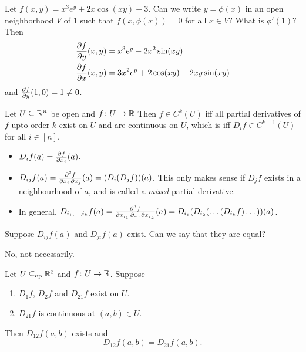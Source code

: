 \begin{example}
    Let $f(x, y) = x^3 e^y + 2x \cos(xy) - 3$.
    Can we write $y = \phi(x)$ in an open neighborhood $V$ of $1$ such that
    $f(x, \phi(x)) = 0$ for all $x \in V$?
    What is $\phi'(1)$?
    Then \begin{align*}
        \pdv{f}{y}(x, y) &= x^3 e^y - 2x^2 \sin(xy) \\
        \pdv{f}{x}(x, y) &= 3x^2 e^y + 2 \cos(xy) - 2xy \sin(xy)
    \end{align*}
    and $\pdv{f}{y}(1, 0) = 1 \ne 0$.
\end{example}

Let $U \subseteq \mathbb{R}^n$ be open and $f\colon U \to \mathbb{R}$
Then $f \in C^k(U)$ iff all partial derivatives of $f$ upto order $k$ exist
on $U$ and are continuous on $U$, which is iff $D_i f \in C^{k-1}(U)$ for
all $i \in [n]$.

\begin{notation} \leavevmode
    \begin{itemize}
        \item $D_if(a) = \pdv{f}{x_i}(a)$.
        \item $D_{ij}f(a) = \pdv{f}{x_i, x_j}(a) = (D_i(D_jf))(a)$.
        This only makes sense if $D_jf$ exists in a neighbourhood of $a$,
        and is called a \emph{mixed} partial derivative.
        \item In general,
        $D_{i_1, \dots, i_k}f(a) = \pdv{f}{x_{i_1}, \dots, x_{i_k}}(a)
        = D_{i_1}(D_{i_2}(\dots(D_{i_k}f)\dots))(a)$.
    \end{itemize}
\end{notation}

\begin{question}
    Suppose $D_{ij}f(a)$ and $D_{ji}f(a)$ exist.
    Can we say that they are equal?
\end{question}
\begin{solution}
    No, not necessarily.
    \TODO
\end{solution}

\begin{theorem}
    Let $U \subseteq_{\mathrm{op}} \mathbb{R}^2$ and $f\colon U \to \mathbb{R}$.
    Suppose
    \begin{enumerate}
        \item $D_1f$, $D_2f$ and $D_{21}f$ exist on $U$.
        \item $D_{21}f$ is continuous at $(a, b) \in U$.
    \end{enumerate}
    Then $D_{12}f(a, b)$ exists and \[
        D_{12}f(a, b) = D_{21}f(a, b).
    \]
\end{theorem}
